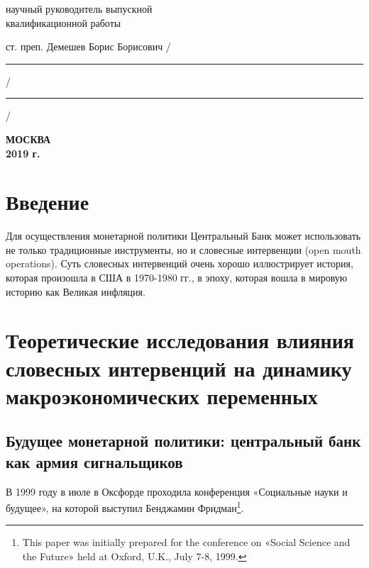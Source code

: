 \documentclass[12pt,a4paper, oneside]{extreport}
\begin{document}
\noindent
научный руководитель выпускной \\
квалификационной работы

\noindent
ст. преп. Демешев Борис Борисович
\hfill /\rule{6em}{0.5pt}/\rule{6em}{0.5pt}/

\hfill{}

%
%

\vfill

\begin{center}
\normalsize \bfseries МОСКВА \\ 2019 г.
\end{center}
\endgroup




\tableofcontents  %



\chapter*{Введение}


Для осуществления монетарной политики Центральный Банк может использовать не только традиционные инструменты, но и словесные интервенции (open mouth operations). Суть словесных интервенций очень хорошо иллюстрирует история, которая произошла в США в 1970-1980 гг., в эпоху, которая вошла в мировую историю как Великая инфляция.


\chapter{Теоретические исследования влияния словесных интервенций на динамику макроэкономических переменных}

\section{Будущее монетарной политики: центральный банк как армия сигнальщиков}

В 1999 году в июле в Оксфорде проходила конференция «Социальные науки и будущее», на которой выступил Бенджамин Фридман\footnote{This paper was initially prepared for the conference on «Social Science and the Future» held at Oxford, U.K., July 7-8, 1999.}.
\end{document}
